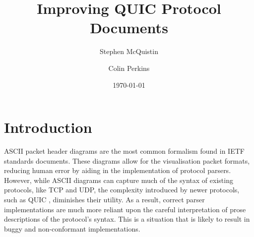 \documentclass[10pt,sigconf]{acmart}
\begin{document}
\title{Improving QUIC Protocol Documents}

\author{Stephen McQuistin}

\author{Colin Perkins}

\date{\today}

\begin{abstract}


\end{abstract}

\maketitle

\section{Introduction}

%

ASCII packet header diagrams are the most common formalism found in IETF standards
documents. These diagrams allow for the visualisation packet formats, reducing human error
by aiding in the implementation of protocol parsers. However, while ASCII diagrams can
capture much of the syntax of existing protocols, like TCP and UDP, the complexity
introduced by newer protocols, such as QUIC \cite{draft-ietf-quic-transport-latest},
diminishes their utility. As a result, correct parser implementations are much more
reliant upon the careful interpretation of prose descriptions of the protocol's syntax.
This is a situation that is likely to result in buggy and non-conformant implementations.
\end{document}
